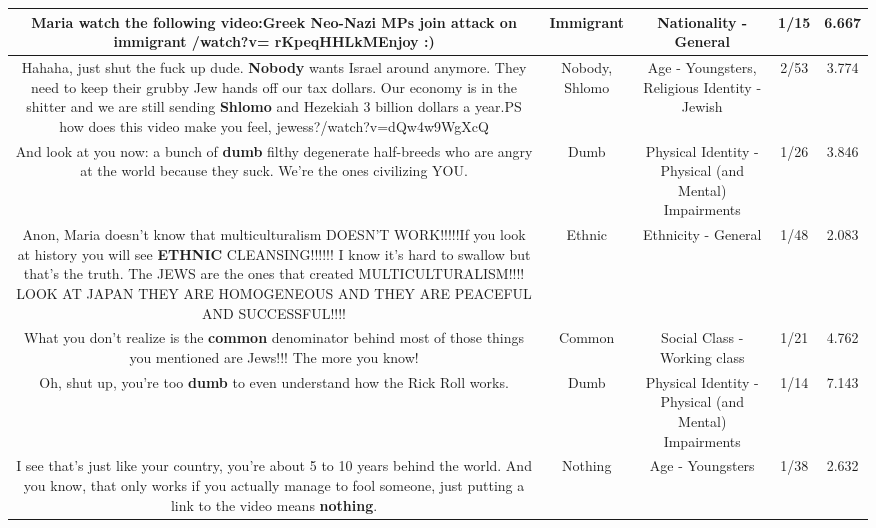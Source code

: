 \documentclass[11pt]{article}
\newlength\mylength
\begin{document}
\begin{center}
\begin{longtable}{|C{.65\mylength}|C{.30\mylength}|C{.12\mylength}|C{.12\mylength}|C{.12\mylength}|}
  \small Maria watch the following video:Greek Neo-Nazi MPs join attack on \textbf{immigrant} /watch?v= rKpeqHHLkMEnjoy :)\normalsize   & Immigrant & Nationality - General & 1/15 & 6.667 \\  \hline
  \small Hahaha, just shut the fuck up dude. \textbf{Nobody} wants Israel around anymore. They need to keep their grubby Jew hands off our tax dollars. Our economy is in the shitter and we are still sending \textbf{Shlomo} and Hezekiah 3 billion dollars a year.PS how does this video make you feel, jewess?/watch?v=dQw4w9WgXcQ\normalsize   & Nobody, Shlomo & Age - Youngsters, Religious Identity - Jewish & 2/53 & 3.774 \\  \hline
  \small And look at you now: a bunch of \textbf{dumb} filthy degenerate half-breeds who are angry at the world because they suck. We're the ones civilizing YOU.\normalsize   & Dumb & Physical Identity - Physical (and Mental) Impairments & 1/26 & 3.846 \\  \hline
  \small Anon, Maria doesn't know that multiculturalism DOESN'T WORK!!!!!If you look at history you will see \textbf{ETHNIC} CLEANSING!!!!!! I know it's hard to swallow but that's the truth. The JEWS are the ones that created MULTICULTURALISM!!!! LOOK AT JAPAN THEY ARE HOMOGENEOUS AND THEY ARE PEACEFUL AND SUCCESSFUL!!!!\normalsize   & Ethnic & Ethnicity - General & 1/48 & 2.083 \\  \hline
  \small What you don't realize is the \textbf{common} denominator behind most of those things you mentioned are Jews!!! The more you know!\normalsize   & Common & Social Class - Working class & 1/21 & 4.762 \\  \hline
  \small Oh, shut up, you're too \textbf{dumb} to even understand how the Rick Roll works.\normalsize   & Dumb & Physical Identity - Physical (and Mental) Impairments & 1/14 & 7.143 \\  \hline
  \small I see that's just like your country, you're about 5 to 10 years behind the world. And you know, that only works if you actually manage to fool someone, just putting a link to the video means \textbf{nothing}.\normalsize   & Nothing & Age - Youngsters & 1/38 & 2.632 \\  \hline

\end{longtable}
\end{center}
\end{document}
